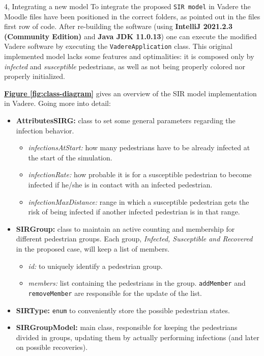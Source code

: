 \documentclass[10pt,a4paper]{article}
\begin{document}
\begin{task}{4, Integrating a new model}
To integrate the proposed \texttt{SIR model} in Vadere the Moodle files have been positioned in the correct folders, as pointed out in the files first row of code. After re-building the software (using \textbf{IntelliJ 2021.2.3 (Community Edition)} and \textbf{Java JDK 11.0.13}) one can execute the modified Vadere software by executing the \texttt{VadereApplication} class. This original implemented model lacks some features and optimalities: it is composed only by \textit{infected} and \textit{susceptible} pedestrians, as well as not being properly colored nor properly initialized.

\textbf{\hyperref[fig:class-diagram]{Figure \ref{fig:class-diagram}}} gives an overview of the SIR model implementation in Vadere. Going more into detail:
\begin{itemize}
    \item \textbf{AttributesSIRG:} class to set some general parameters regarding the infection behavior.
    \begin{itemize}
        \item \textit{infectionsAtStart:} how many pedestrians have to be already infected at the start of the simulation.
        \item \textit{infectionRate:} how probable it is for a susceptible pedestrian to become infected if he/she is in contact with an infected pedestrian.
        \item \textit{infectionMaxDistance:} range in which a susceptible pedestrian gets the risk of being infected if another infected pedestrian is in that range.
    \end{itemize}
    \item \textbf{SIRGroup:} class to maintain an active counting and membership for different pedestrian groups. Each group, \textit{Infected, Susceptible and Recovered} in the proposed case, will keep a list of members.
    \begin{itemize}
        \item \textit{id:} to uniquely identify a pedestrian group.
        \item \textit{members:} list containing the pedestrians in the group. \texttt{addMember} and \texttt{removeMember} are responsible for the update of the list.
    \end{itemize}
    \item \textbf{SIRType:} \texttt{enum} \cite{enum} to conveniently store the possible pedestrian states.
    \item \textbf{SIRGroupModel:} main class, responsible for keeping the pedestrians divided in groups, updating them by actually performing infections (and later on possible recoveries).

\end{itemize}
\end{task}
\end{document}
